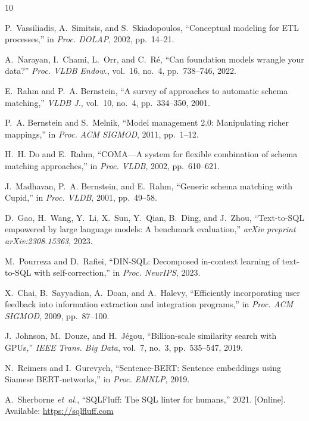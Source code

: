 \documentclass[conference]{IEEEtran}
\begin{document}
\balance

\begin{thebibliography}{10}

P.~Vassiliadis, A.~Simitsis, and S.~Skiadopoulos,
``Conceptual modeling for ETL processes,''
in \emph{Proc. DOLAP}, 2002, pp.~14--21.

A.~Narayan, I.~Chami, L.~Orr, and C.~R\'{e},
``Can foundation models wrangle your data?''
\emph{Proc. VLDB Endow.}, vol.~16, no.~4, pp.~738--746, 2022.

E.~Rahm and P.~A. Bernstein,
``A survey of approaches to automatic schema matching,''
\emph{VLDB J.}, vol.~10, no.~4, pp.~334--350, 2001.

P.~A. Bernstein and S.~Melnik,
``Model management 2.0: Manipulating richer mappings,''
in \emph{Proc. ACM SIGMOD}, 2011, pp.~1--12.

H.~H. Do and E.~Rahm,
``COMA---A system for flexible combination of schema matching approaches,''
in \emph{Proc. VLDB}, 2002, pp.~610--621.

J.~Madhavan, P.~A. Bernstein, and E.~Rahm,
``Generic schema matching with Cupid,''
in \emph{Proc. VLDB}, 2001, pp.~49--58.

D.~Gao, H.~Wang, Y.~Li, X.~Sun, Y.~Qian, B.~Ding, and J.~Zhou,
``Text-to-SQL empowered by large language models: A benchmark evaluation,''
\emph{arXiv preprint arXiv:2308.15363}, 2023.

M.~Pourreza and D.~Rafiei,
``DIN-SQL: Decomposed in-context learning of text-to-SQL with self-correction,''
in \emph{Proc. NeurIPS}, 2023.

X.~Chai, B.~Sayyadian, A.~Doan, and A.~Halevy,
``Efficiently incorporating user feedback into information extraction and
integration programs,''
in \emph{Proc. ACM SIGMOD}, 2009, pp.~87--100.

J.~Johnson, M.~Douze, and H.~J\'{e}gou,
``Billion-scale similarity search with GPUs,''
\emph{IEEE Trans. Big Data}, vol.~7, no.~3, pp.~535--547, 2019.

N.~Reimers and I.~Gurevych,
``Sentence-BERT: Sentence embeddings using Siamese BERT-networks,''
in \emph{Proc. EMNLP}, 2019.

A.~Sherborne \emph{et~al.},
``SQLFluff: The SQL linter for humans,'' 2021.
[Online]. Available: \url{https://sqlfluff.com}

\end{thebibliography}
\end{document}
